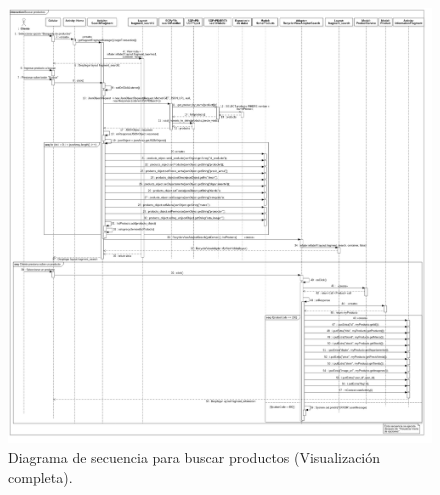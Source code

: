 \FloatBarrier
\begin{figure}[htbp!]
		\centering
			\includegraphics[width=1.1 \textwidth]{imagenes/Diagramas_UserApp/Nuevos_diagramas/buscarPoductos}
		\caption{Diagrama de secuencia para buscar productos (Visualización completa).}
		\label{image:busca1}
\end{figure}
\FloatBarrier

